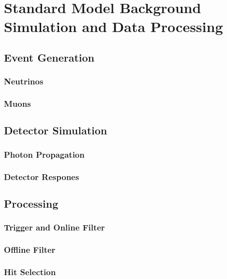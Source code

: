 \setchapterpreamble[u]{\margintoc}

\chapter{Standard Model Background Simulation and Data Processing}



\section{Event Generation}

\subsection{Neutrinos}

\subsection{Muons}



\section{Detector Simulation}

\subsection{Photon Propagation}

\subsection{Detector Respones}


\section{Processing}

\subsection{Trigger and Online Filter}

\subsection{Offline Filter}


\subsection{Hit Selection} 

